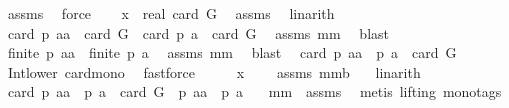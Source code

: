 \begin{isabellebody}
\ assms\ \isamarkupfalse%
\ force\ \isamarkupfalse%
\ \isamarkupfalse%
\isanewline
{}{\isacharcolon}\ {\isachardoublequoteopen}x\ {\isasymle}\ real\ {\isacharparenleft}card\ G{\isacharparenright}{\isachardoublequoteclose}\ \isamarkupfalse%
\ assms\ \isamarkupfalse%
\ linarith\ \isamarkupfalse%
\ \isanewline
{}{\isacharcolon}\ {\isachardoublequoteopen}card\ {\isacharparenleft}{\isacharquery}p\ aa{\isacharparenright}\ {\isacharequal}\ card\ G\ {\isacharampersand}\ card\ {\isacharparenleft}{\isacharquery}p\ a{\isacharparenright}\ {\isacharequal}\ card\ G{\isachardoublequoteclose}\ \isamarkupfalse%
\ assms\ mm{}{}\ \isamarkupfalse%
\ blast\ \isanewline
{}\isamarkupfalse%
\ \isamarkupfalse%
\ {\isachardoublequoteopen}finite\ {\isacharparenleft}{\isacharquery}p\ aa{\isacharparenright}\ {\isacharampersand}\ finite\ {\isacharparenleft}{\isacharquery}p\ a{\isacharparenright}{\isachardoublequoteclose}\ \isamarkupfalse%
\ assms\ mm{}{}\ \isamarkupfalse%
\ blast\ \isamarkupfalse%
\isanewline
{}\isamarkupfalse%
\ {\isachardoublequoteopen}card\ {\isacharparenleft}{\isacharquery}p\ aa\ {\isasyminter}\ {\isacharquery}p\ a{\isacharparenright}\ {\isasymle}\ card\ G{\isachardoublequoteclose}\ \isamarkupfalse%
\ Int{\isacharunderscore}lower{}\ card{\isacharunderscore}mono\ \isamarkupfalse%
\ fastforce\ \isamarkupfalse%
\ \isamarkupfalse%
\ \isanewline
{}{\isacharcolon}\ {\isachardoublequoteopen}x\ {\isasymge}\ {}{\isachardoublequoteclose}\ \isamarkupfalse%
\ assms\ mm{}{}b\ {}\ \isamarkupfalse%
\ linarith\ \isanewline
{}\isamarkupfalse%
\ {\isachardoublequoteopen}card\ {\isacharparenleft}{\isacharquery}p\ aa\ {\isasyminter}\ {\isacharparenleft}{\isacharquery}p\ a{\isacharparenright}{\isacharparenright}\ {\isacharequal}\ card\ G\ {\isasymlongleftrightarrow}\ {\isacharparenleft}{\isacharquery}p\ aa\ {\isacharequal}\ {\isacharquery}p\ a{\isacharparenright}{\isachardoublequoteclose}\ \isanewline
{}\isamarkupfalse%
\ {}\ mm{}{}\ {}\ assms\ \isamarkupfalse%
\ {\isacharparenleft}metis\ {\isacharparenleft}lifting{\isacharcomma}\ mono{\isacharunderscore}tags{\isacharparenright}{\isacharparenright}\isanewline

\end{isabellebody}
